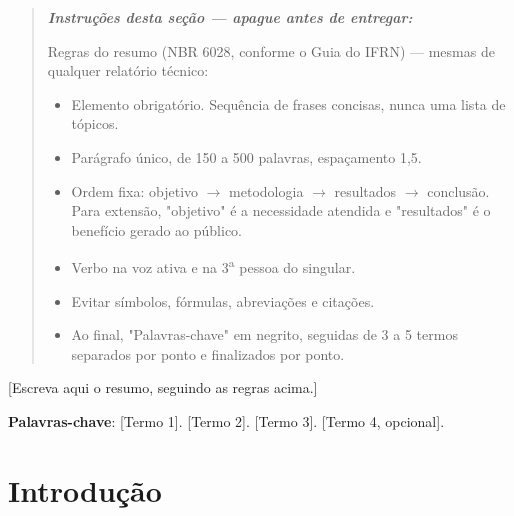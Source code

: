 \documentclass[article,12pt,a4paper,oneside]{abntex2}
\newenvironment{instrucoes}{%
  \begin{quotation}\footnotesize\itshape
  \noindent\textbf{\upshape Instruções desta seção — apague antes de entregar:}\par\smallskip
}{%
  \end{quotation}
}
\begin{document}
\maketitle

\begin{resumo}
\begin{instrucoes}
Regras do resumo (NBR 6028, conforme o Guia do IFRN) — mesmas de qualquer relatório técnico:
\begin{itemize}
  \item Elemento obrigatório. Sequência de frases concisas, nunca uma lista de tópicos.
  \item Parágrafo único, de 150 a 500 palavras, espaçamento 1,5.
  \item Ordem fixa: objetivo $\to$ metodologia $\to$ resultados $\to$ conclusão. Para extensão, "objetivo" é a necessidade atendida e "resultados" é o benefício gerado ao público.
  \item Verbo na voz ativa e na 3\textsuperscript{a} pessoa do singular.
  \item Evitar símbolos, fórmulas, abreviações e citações.
  \item Ao final, "Palavras-chave" em negrito, seguidas de 3 a 5 termos separados por ponto e finalizados por ponto.
\end{itemize}
\end{instrucoes}

[Escreva aqui o resumo, seguindo as regras acima.]

\vspace{\onelineskip}
\noindent
\textbf{Palavras-chave}: [Termo 1]. [Termo 2]. [Termo 3]. [Termo 4, opcional].
\end{resumo}

\textual

\section{Introdução}
\end{document}
